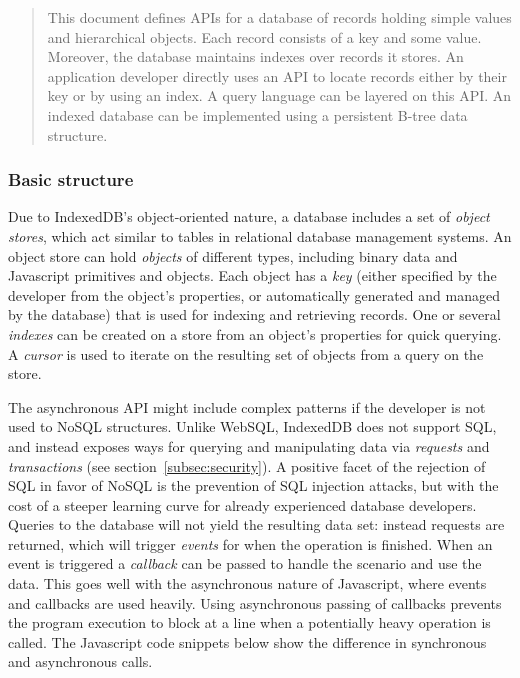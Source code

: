 \begin{quote}
This document defines APIs for a database of records holding simple values and hierarchical objects. Each record consists of a key and some value. Moreover, the database maintains indexes over records it stores. An application developer directly uses an API to locate records either by their key or by using an index. A query language can be layered on this API. An indexed database can be implemented using a persistent B-tree data structure.
\end{quote}

\subsubsection{Basic structure}
Due to IndexedDB's object-oriented nature, a database includes a set of \emph{object stores}, which act similar to tables in relational database management systems. An object store can hold \emph{objects} of different types, including binary data and Javascript primitives and objects. Each object has a \emph{key} (either specified by the developer from the object's properties, or automatically generated and managed by the database) that is used for indexing and retrieving records. One or several \emph{indexes} can be created on a store from an object's properties for quick querying. A \emph{cursor} is used to iterate on the resulting set of objects from a query on the store.

The asynchronous API might include complex patterns if the developer is not used to NoSQL structures. Unlike WebSQL, IndexedDB does not support SQL, and instead exposes ways for querying and manipulating data via \emph{requests} and \emph{transactions} (see section~\ref{subsec:security}). A positive facet of the rejection of SQL in favor of NoSQL is the prevention of SQL injection attacks, but with the cost of a steeper learning curve for already experienced database developers. Queries to the database will not yield the resulting data set: instead requests are returned, which will trigger \emph{events} for when the operation is finished. When an event is triggered a \emph{callback} can be passed to handle the scenario and use the data. This goes well with the asynchronous nature of Javascript, where events and callbacks are used heavily. Using asynchronous passing of callbacks prevents the program execution to block at a line when a potentially heavy operation is called. The Javascript code snippets below show the difference in synchronous and asynchronous calls.

